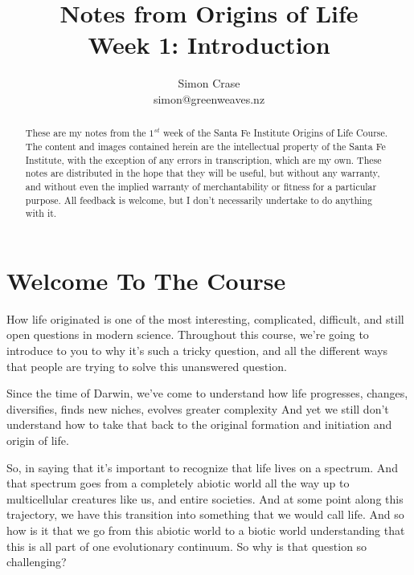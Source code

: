 \documentclass[]{article}
\title{
	Notes from Origins of Life\\
	Week 1: Introduction
}
\author{Simon Crase\\simon@greenweaves.nz}
\begin{document}
\maketitle

\begin{abstract}
    These are my notes from the $1^{st}$ week of the Santa Fe Institute Origins of Life Course\cite{sfi2019}.\\
    The content and images contained herein are the intellectual property of the Santa Fe Institute, with the exception of any errors in transcription, which are my own.
    These notes are distributed in the hope that they will be useful,
    but without any warranty, and without even the implied warranty of
     merchantability or fitness for a particular purpose. All feedback is welcome,
    but I don't necessarily undertake to do anything with it.
\end{abstract}

\setcounter{tocdepth}{2}
\tableofcontents
\listoffigures

\section{Welcome To The Course}


How life originated is one of the most interesting, complicated, difficult, and still open questions in modern science. Throughout this course, we're going to
introduce to you to why it's such a tricky question, and all the different ways that people are trying to solve this unanswered question.	

Since the time of Darwin, we've come to understand how life
progresses, changes, diversifies, finds new niches, evolves greater complexity
And yet we still don't understand how to take that back to
the original formation and initiation and origin of life.


So, in saying that it's important to recognize that life lives on a spectrum.
And that spectrum goes from a completely abiotic world
all the way up to multicellular creatures like us, and entire societies.
And at some point along this trajectory, we have this transition into something
that we would call life. And so how is it that we go from this
abiotic world to a biotic world understanding that this is all part of one
evolutionary continuum. So why is that question so challenging?
\end{document}
